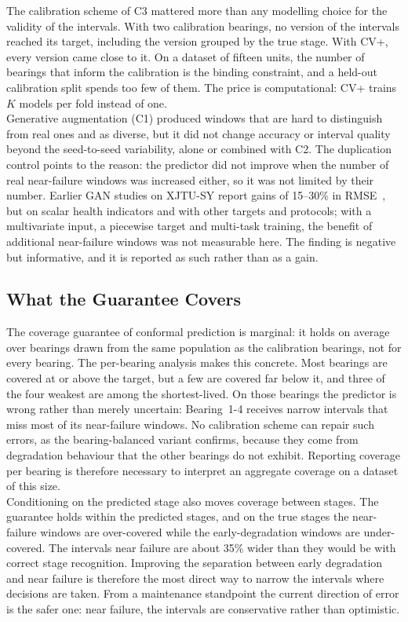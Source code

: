 \documentclass[review]{elsarticle}
\begin{document}
The calibration scheme of C3 mattered more than any modelling choice
for the validity of the intervals. With two calibration bearings, no
version of the intervals reached its target, including the version
grouped by the true stage. With CV+, every version came close to it.
On a dataset of fifteen units, the number of bearings that inform the
calibration is the binding constraint, and a held-out calibration split
spends too few of them. The price is computational: CV+ trains $K$
models per fold instead of one.\\

Generative augmentation (C1) produced windows that are hard to
distinguish from real ones and as diverse, but it did not change
accuracy or interval quality beyond the seed-to-seed variability, alone
or combined with C2. The duplication control points to the reason: the
predictor did not improve when the number of real near-failure windows
was increased either, so it was not limited by their number. Earlier
GAN studies on XJTU-SY report gains of 15--30\% in
RMSE~\cite{9486650, lu_joint_2022}, but on scalar health indicators and
with other targets and protocols; with a multivariate input, a
piecewise target and multi-task training, the benefit of additional
near-failure windows was not measurable here. The finding is negative
but informative, and it is reported as such rather than as a gain.

\subsection{What the Guarantee Covers}

The coverage guarantee of conformal prediction is marginal: it holds on
average over bearings drawn from the same population as the
calibration bearings, not for every bearing. The per-bearing analysis
makes this concrete. Most bearings are covered at or above the target,
but a few are covered far below it, and three of the four weakest are
among the shortest-lived. On those bearings the predictor is wrong
rather than merely uncertain: Bearing~1-4 receives narrow intervals
that miss most of its near-failure windows. No calibration scheme can
repair such errors, as the bearing-balanced variant confirms, because
they come from degradation behaviour that the other bearings do not
exhibit. Reporting coverage per bearing is therefore necessary to
interpret an aggregate coverage on a dataset of this size.\\

Conditioning on the predicted stage also moves coverage between stages.
The guarantee holds within the predicted stages, and on the true stages
the near-failure windows are over-covered while the early-degradation
windows are under-covered. The intervals near failure are about 35\%
wider than they would be with correct stage recognition. Improving the
separation between early degradation and near failure is therefore the
most direct way to narrow the intervals where decisions are taken. From
a maintenance standpoint the current direction of error is the safer
one: near failure, the intervals are conservative rather than
optimistic.
\end{document}
